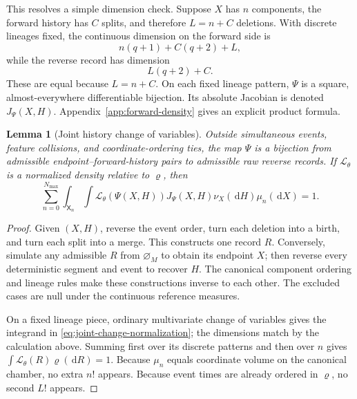\documentclass[10pt]{article}
\newtheorem{lemma}[theorem]{Lemma}
\theoremstyle{definition}
\theoremstyle{remark}
\newcommand{\dd}{\,\mathrm{d}}
\newcommand{\emptyconfig}{\varnothing_M}
\newcommand{\state}{\mathsf{X}}
\begin{document}
This resolves a simple dimension check.  Suppose $X$ has $n$ components,
the forward history has $C$ splits, and therefore $L=n+C$ deletions.  With
discrete lineages fixed, the continuous dimension on the forward side is
\begin{equation}
  n(q+1)+C(q+2)+L,
\end{equation}
while the reverse record has dimension
\begin{equation}
  L(q+2)+C.
\end{equation}
These are equal because $L=n+C$.  On each fixed lineage pattern, $\Psi$ is
a square, almost-everywhere differentiable bijection.  Its absolute
Jacobian is denoted $J_\Psi(X,H)$.  Appendix~\ref{app:forward-density}
gives an explicit product formula.

\begin{lemma}[Joint history change of variables]
\label{lem:joint-history-change}
Outside simultaneous events, feature collisions, and coordinate-ordering
ties, the map $\Psi$ is a bijection from admissible endpoint--forward-history
pairs to admissible raw reverse records.  If
$\mathcal L_\theta$ is a normalized density relative to $\varrho$, then
\begin{equation}
  \sum_{n=0}^{N_{\max}}\int_{\state_n}\int
  \mathcal L_\theta(\Psi(X,H))J_\Psi(X,H)
  \nu_X(\dd H)\mu_n(\dd X)=1.
  \label{eq:joint-change-normalization}
\end{equation}
\end{lemma}

\begin{proof}
Given $(X,H)$, reverse the event order, turn each deletion into a birth, and
turn each split into a merge.  This constructs one record $R$.  Conversely,
simulate any admissible $R$ from $\emptyconfig$ to obtain its endpoint $X$;
then reverse every deterministic segment and event to recover $H$.  The
canonical component ordering and lineage rules make these constructions
inverse to each other.  The excluded cases are null under the continuous
reference measures.

On a fixed lineage piece, ordinary multivariate change of variables gives
the integrand in \eqref{eq:joint-change-normalization}; the dimensions match
by the calculation above.  Summing first over its discrete patterns and then
over $n$ gives
$\int\mathcal L_\theta(R)\varrho(\dd R)=1$.  Because $\mu_n$ equals
coordinate volume on the canonical chamber, no extra $n!$ appears.  Because
event times are already ordered in $\varrho$, no second $L!$ appears.
\end{proof}
\end{document}
